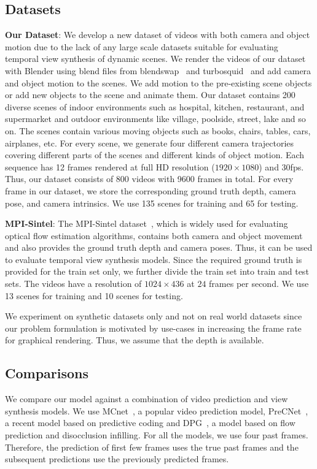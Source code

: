 \documentclass[preprint]{vgtc}
\begin{document}
    \subsection{Datasets}\label{subsec:datasets}
    \textbf{Our Dataset}: We develop a new dataset of videos with both camera and object motion due to the lack of any large scale datasets suitable for evaluating temporal view synthesis of dynamic scenes.
    We render the videos of our dataset with Blender using blend files from blendswap~\cite{blendswap2021blendswap} and turbosquid~\cite{turbosquid2021turbosquid} and add camera and object motion to the scenes.
    We add motion to the pre-existing scene objects or add new objects to the scene and animate them.
    Our dataset contains 200 diverse scenes of indoor environments such as hospital, kitchen, restaurant, and supermarket and outdoor environments like village, poolside, street, lake and so on.
    The scenes contain various moving objects such as books, chairs, tables, cars, airplanes, etc.
    For every scene, we generate four different camera trajectories covering different parts of the scenes and different kinds of object motion.
    Each sequence has 12 frames rendered at full HD resolution ($1920 \times 1080$) and 30fps.
    Thus, our dataset consists of 800 videos with 9600 frames in total.
    For every frame in our dataset, we store the corresponding ground truth depth, camera pose, and camera intrinsics.
    We use 135 scenes for training and 65 for testing.

    \textbf{MPI-Sintel}: The MPI-Sintel dataset~\cite{butler2012sintel}, which is widely used for evaluating optical flow estimation algorithms, contains both camera and object movement and also provides the ground truth depth and camera poses.
    Thus, it can be used to evaluate temporal view synthesis models.
    Since the required ground truth is provided for the train set only, we further divide the train set into train and test sets.
    The videos have a resolution of $1024 \times 436$ at $24$ frames per second.
    We use 13 scenes for training and 10 scenes for testing.


    We experiment on synthetic datasets only and not on real world datasets since our problem formulation is motivated by use-cases in increasing the frame rate for graphical rendering.
    Thus, we assume that the depth is available.

    \subsection{Comparisons}\label{subsec:comparisons}
    We compare our model against a combination of video prediction and view synthesis models.
    We use MCnet~\cite{villegas2017mcnet}, a popular video prediction model, PreCNet~\cite{straka2020precnet}, a recent model based on predictive coding and DPG~\cite{gao2019disentangling}, a model based on flow prediction and disocclusion infilling.
    For all the models, we use four past frames.
    Therefore, the prediction of first few frames uses the true past frames and the subsequent predictions use the previously predicted frames.
\end{document}
